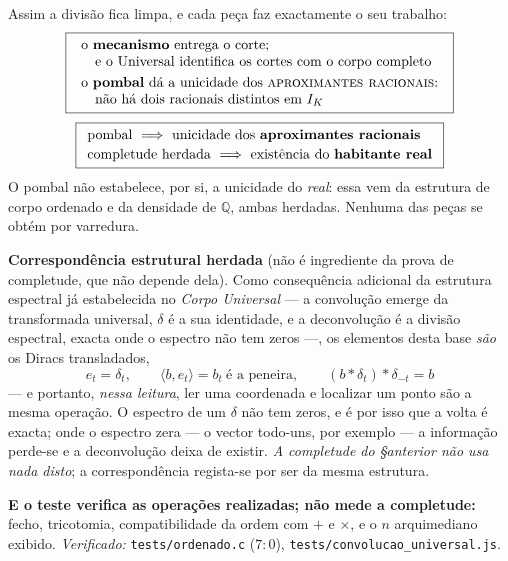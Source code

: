 \documentclass[11pt,a4paper]{article}
\newcommand{\code}[1]{\texttt{\small #1}}
\begin{document}
\medskip
\noindent Assim a divisão fica limpa, e cada peça faz exactamente o seu trabalho:
\[
\boxed{\;\begin{array}{l}
\text{o \textbf{mecanismo} entrega o corte;}\\
\quad\text{e o Universal identifica os cortes com o corpo completo}\\[3pt]
\text{o \textbf{pombal} dá a unicidade dos \textsc{aproximantes racionais}:}\\
\quad\text{não há dois racionais distintos em }I_K
\end{array}\;}
\]
\[
\boxed{
\begin{array}{l}
\text{pombal}\ \Longrightarrow\ \text{unicidade dos \textbf{aproximantes racionais}}\\[2pt]
\text{completude herdada}\ \Longrightarrow\ \text{existência do \textbf{habitante real}}
\end{array}}
\]
O pombal não estabelece, por si, a unicidade do \emph{real}: essa vem da estrutura
de corpo ordenado e da densidade de $\mathbb{Q}$, ambas herdadas. Nenhuma das
peças se obtém por varredura.

\medskip
\noindent\textbf{Correspondência estrutural herdada} (não é ingrediente da prova
de completude, que não depende dela). Como consequência adicional da estrutura
espectral já estabelecida no \emph{Corpo Universal} --- a convolução emerge da
transformada universal, $\delta$ é a sua identidade, e a deconvolução é a divisão
espectral, exacta onde o espectro não tem zeros ---, os elementos desta base
\emph{são} os Diracs transladados,
\[
\boxed{\;e_t=\delta_t,
\qquad \langle b,e_t\rangle=b_t\ \text{é a peneira},
\qquad (b\ast\delta_{t})\ast\delta_{-t}=b\;}
\]
--- e portanto, \emph{nessa leitura}, ler uma coordenada e localizar um ponto são
a mesma operação. O espectro de um $\delta$ não tem zeros, e é por isso que a
volta é exacta; onde o espectro zera --- o vector todo-uns, por exemplo --- a
informação perde-se e a deconvolução deixa de existir. \emph{A completude do
\S anterior não usa nada disto}; a correspondência regista-se por ser da mesma
estrutura.

\medskip
\noindent\textbf{E o teste verifica as operações realizadas; não mede a
completude:}
fecho, tricotomia, compatibilidade da ordem com $+$ e $\times$, e o $n$
arquimediano exibido. \emph{Verificado:} \code{tests/ordenado.c} ($7{:}0$),
\code{tests/convolucao\_universal.js}.
\end{document}
